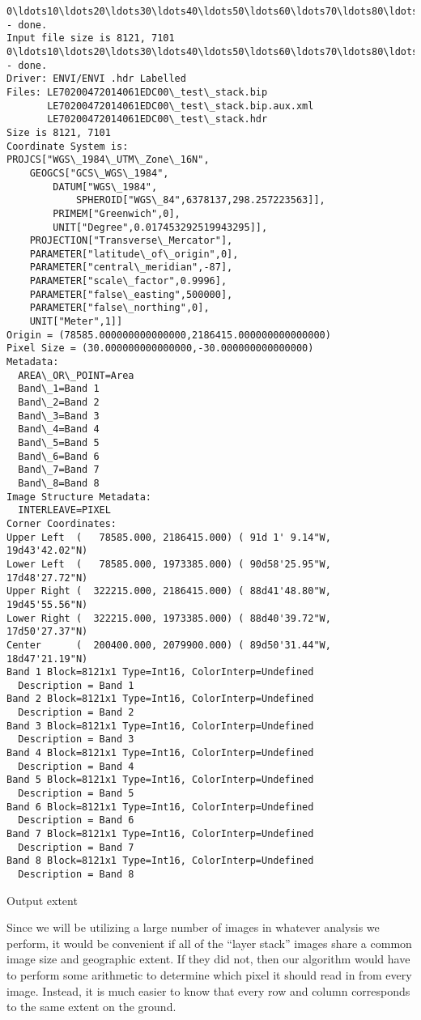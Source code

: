 \documentclass{article}
\begin{document}
    \begin{Verbatim}[commandchars=\\\{\}]
0\ldots10\ldots20\ldots30\ldots40\ldots50\ldots60\ldots70\ldots80\ldots90\ldots100 - done.
Input file size is 8121, 7101
0\ldots10\ldots20\ldots30\ldots40\ldots50\ldots60\ldots70\ldots80\ldots90\ldots100 - done.
Driver: ENVI/ENVI .hdr Labelled
Files: LE70200472014061EDC00\_test\_stack.bip
       LE70200472014061EDC00\_test\_stack.bip.aux.xml
       LE70200472014061EDC00\_test\_stack.hdr
Size is 8121, 7101
Coordinate System is:
PROJCS["WGS\_1984\_UTM\_Zone\_16N",
    GEOGCS["GCS\_WGS\_1984",
        DATUM["WGS\_1984",
            SPHEROID["WGS\_84",6378137,298.257223563]],
        PRIMEM["Greenwich",0],
        UNIT["Degree",0.017453292519943295]],
    PROJECTION["Transverse\_Mercator"],
    PARAMETER["latitude\_of\_origin",0],
    PARAMETER["central\_meridian",-87],
    PARAMETER["scale\_factor",0.9996],
    PARAMETER["false\_easting",500000],
    PARAMETER["false\_northing",0],
    UNIT["Meter",1]]
Origin = (78585.000000000000000,2186415.000000000000000)
Pixel Size = (30.000000000000000,-30.000000000000000)
Metadata:
  AREA\_OR\_POINT=Area
  Band\_1=Band 1
  Band\_2=Band 2
  Band\_3=Band 3
  Band\_4=Band 4
  Band\_5=Band 5
  Band\_6=Band 6
  Band\_7=Band 7
  Band\_8=Band 8
Image Structure Metadata:
  INTERLEAVE=PIXEL
Corner Coordinates:
Upper Left  (   78585.000, 2186415.000) ( 91d 1' 9.14"W, 19d43'42.02"N)
Lower Left  (   78585.000, 1973385.000) ( 90d58'25.95"W, 17d48'27.72"N)
Upper Right (  322215.000, 2186415.000) ( 88d41'48.80"W, 19d45'55.56"N)
Lower Right (  322215.000, 1973385.000) ( 88d40'39.72"W, 17d50'27.37"N)
Center      (  200400.000, 2079900.000) ( 89d50'31.44"W, 18d47'21.19"N)
Band 1 Block=8121x1 Type=Int16, ColorInterp=Undefined
  Description = Band 1
Band 2 Block=8121x1 Type=Int16, ColorInterp=Undefined
  Description = Band 2
Band 3 Block=8121x1 Type=Int16, ColorInterp=Undefined
  Description = Band 3
Band 4 Block=8121x1 Type=Int16, ColorInterp=Undefined
  Description = Band 4
Band 5 Block=8121x1 Type=Int16, ColorInterp=Undefined
  Description = Band 5
Band 6 Block=8121x1 Type=Int16, ColorInterp=Undefined
  Description = Band 6
Band 7 Block=8121x1 Type=Int16, ColorInterp=Undefined
  Description = Band 7
Band 8 Block=8121x1 Type=Int16, ColorInterp=Undefined
  Description = Band 8
    \end{Verbatim}

    Output extent

Since we will be utilizing a large number of images in whatever analysis
we perform, it would be convenient if all of the ``layer stack'' images
share a common image size and geographic extent. If they did not, then
our algorithm would have to perform some arithmetic to determine which
pixel it should read in from every image. Instead, it is much easier to
know that every row and column corresponds to the same extent on the
ground.
\end{document}
